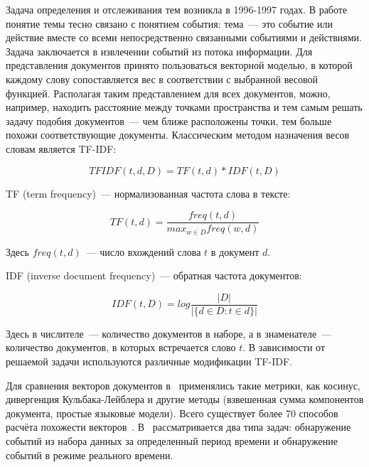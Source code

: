 Задача определения и отслеживания тем возникла в 1996-1997 годах. В работе~\cite{Allan98topicdetection} понятие темы тесно связано с понятием события: тема~--- это событие или действие вместе со всеми непосредственно связанными событиями и действиями. Задача заключается в извлечении событий из потока информации. 
Для представления документов принято пользоваться векторной моделью, в которой каждому слову сопоставляется вес в  соответствии с выбранной весовой функцией. Располагая таким представлением для всех документов, можно, например, находить расстояние между точками пространства и тем самым решать задачу подобия документов~--- чем ближе расположены точки, тем больше похожи соответствующие документы. Классическим методом назначения весов словам является TF-IDF:

\begin{equation} \label{eq:tfidf}
TFIDF(t,d,D)=TF(t,d)*IDF(t,D)
\end{equation}

TF (term frequency)~--- нормализованная частота слова в тексте: 

\begin{equation}\label{eq:tf}
TF(t,d)=\frac{freq(t,d)}{max_{w\in D}freq(w,d)}
\end{equation}

Здесь $freq(t,d)$~--- число вхождений слова $t$ в документ $d$.

IDF (inverse document frequency)~--- обратная частота документов: 

\begin{equation}\label{eq:idf}
IDF(t,D)=log\frac{|D|}{|\{d\in D:t\in d\}|}
\end{equation}

Здесь в числителе~--- количество документов в наборе, а в знаменателе~--- количество документов, в которых встречается слово $t$. В зависимости от решаемой задачи используются различные модификации TF-IDF.  

Для сравнения векторов документов в~\cite{Allan98topicdetection} применялись такие метрики, как косинус, дивергенция Кульбака-Лейблера и другие методы (взвешенная сумма компонентов документа, простые языковые модели). Всего существует более 70 способов расчёта похожести векторов~\cite{choi2010survey}. В~\cite{Allan98topicdetection} рассматривается два типа задач: обнаружение событий из набора данных за определенный период времени и обнаружение событий в режиме реального времени.

